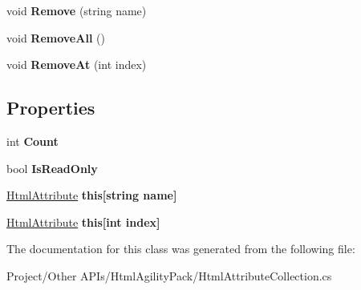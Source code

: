 \begin{DoxyCompactItemize}
\mbox{\label{class_html_agility_pack_1_1_html_attribute_collection_afe1538bf5c2d46b3d9b9cabad36145e1}} 
void {\bfseries Remove} (string name)
\item 
\mbox{\label{class_html_agility_pack_1_1_html_attribute_collection_ad173c2cc928d9237b7933fc6f25245a8}} 
void {\bfseries Remove\+All} ()
\item 
\mbox{\label{class_html_agility_pack_1_1_html_attribute_collection_a4f4f416973c85bd93c829773edc07e3e}} 
void {\bfseries Remove\+At} (int index)
\end{DoxyCompactItemize}
\subsection*{Properties}
\begin{DoxyCompactItemize}
\item 
\mbox{\label{class_html_agility_pack_1_1_html_attribute_collection_afa0cbd891b38d2d4aad0a4e964dedf10}} 
int {\bfseries Count}
\item 
\mbox{\label{class_html_agility_pack_1_1_html_attribute_collection_a809f68d2a99ac2d8bbaaa693d7f12f15}} 
bool {\bfseries Is\+Read\+Only}
\item 
\mbox{\label{class_html_agility_pack_1_1_html_attribute_collection_a928e95249a940b48a9bb7f1bf13b1294}} 
\hyperlink{class_html_agility_pack_1_1_html_attribute}{Html\+Attribute} {\bfseries this\mbox{[}string name\mbox{]}}
\item 
\mbox{\label{class_html_agility_pack_1_1_html_attribute_collection_a13f6ce378228e69df507f25f9efd7380}} 
\hyperlink{class_html_agility_pack_1_1_html_attribute}{Html\+Attribute} {\bfseries this\mbox{[}int index\mbox{]}}
\end{DoxyCompactItemize}


The documentation for this class was generated from the following file\+:\begin{DoxyCompactItemize}
\item 
Project/\+Other A\+P\+Is/\+Html\+Agility\+Pack/Html\+Attribute\+Collection.\+cs\end{DoxyCompactItemize}
